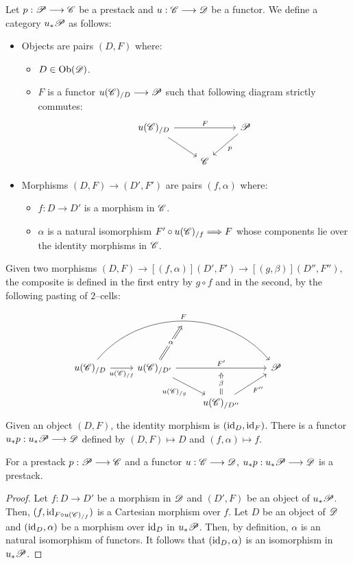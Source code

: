 \documentclass[11pt]{amsart}
\begin{document}
\begin{cns}\label{cns:prest-pushfwd}
Let $p : \sP \to \sC$ be a prestack and $u : \sC \to \sD$ be a functor.
We define a category $u_*\mathscr{P}$ as follows:
\begin{itemize}
\item Objects are pairs $(D, F)$ where:
    \begin{itemize}
    \item $D \in \Ob{\sD}$.
    \item $F$ is a functor $u(\sC)_{/D} \to \sP$ such that following diagram strictly commutes:
    \[\begin{tikzcd}
    u(\sC)_{/D} \ar[rr, "F"] \ar[rd] & & \sP \ar[ld, "p" below right] \\
    & \sC &
    \end{tikzcd}\]
    \end{itemize}
\item Morphisms $(D, F) \to (D', F')$ are pairs $(f, \alpha)$ where:
    \begin{itemize}
    \item $f : D \to D'$ is a morphism in $\mathscr{C}$.
    \item $\alpha$ is a natural isomorphism $F' \circ u(\sC)_{/f} \To F$ whose components
    lie over the identity morphisms in $\mathscr{C}$.
    \end{itemize}
\end{itemize}
Given two morphisms $(D, F) \to[(f, \alpha)] (D', F') \to[(g, \beta)] (D'', F'')$, the composite
is defined in the first entry by $g \circ f$ and in the second, by the following pasting of
$2$--cells:
\[\begin{tikzcd}
u(\sC)_{/D}
    \ar[r, "u(\sC)_{/f}" below]
    \ar[rrr, bend left=5em, "F" above, ""{name=T1, below}] &
u(\sC)_{/D'}
    \ar[rd, "u(\sC)_{/g}" below left]
    \ar[rr, "F'" above, ""{name=T2, below}] & &
\sP \\
& & u(\sC)_{/D''} \ar[ru, "F''" below right]
\ar[from=1-2, to=T1, Rightarrow, "\alpha" description]
\ar[from=2-3, to=T2, Rightarrow, "\beta" description]
&
\end{tikzcd}\]
Given an object $(D, F)$, the identity morphism is $(\mathrm{id}_D, \mathrm{id}_F)$.
There is a functor $u_*p : u_*\sP \to \sD$ defined by $(D, F) \mapsto D$ and
$(f, \alpha) \mapsto f$.
\end{cns}

\begin{prop}
For a prestack $p : \sP \to \sC$ and a functor $u : \sC \to \sD$, $u_*p : u_*\sP \to \sD$
is a prestack.
\end{prop}
\begin{proof}
Let $f : D \to D'$ be a morphism in $\mathscr{D}$ and $(D', F)$ be an object of $u_*\mathscr{P}$.
Then, $(f, \mathrm{id}_{F \circ u(\mathscr{C})_{/f}})$ is a Cartesian morphism over $f$.
Let $D$ be an object of $\mathscr{D}$ and $(\mathrm{id}_D, \alpha)$ be a morphism over $\mathrm{id}_D$ in $u_*\mathscr{P}$.
Then, by definition, $\alpha$ is an natural isomorphism of functors. It follows that
$(\mathrm{id}_D, \alpha)$ is an isomorphism in $u_*\mathscr{P}$.
\end{proof}
\end{document}
